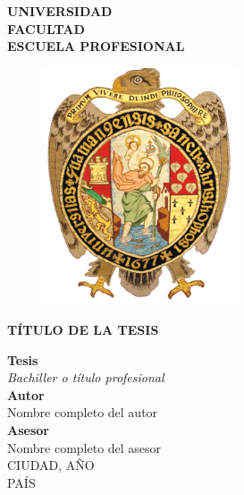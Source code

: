 \documentclass[12pt,a4paper]{article} %
\begin{document}
\pagestyle{empty} %

\begin{titlepage}
	\begin{center}
		{\textbf{UNIVERSIDAD}}\\
		{\textbf{FACULTAD}}\\
		{\textbf{ESCUELA PROFESIONAL}}\\
		\vspace{2cm}
			\begin{figure}[h]
				\centering
				\includegraphics[height=7cm]{EXAMEN_FINAL/Imagenes/logo-unsch.png}
			\end{figure}
		\vspace{2mm}
				\begin{center}
					{\textbf{TÍTULO DE LA TESIS}}
				\end{center}
	  \vspace{1cm}
			{\bf Tesis}\\
		\vspace{2mm}
			{\textit{Bachiller o título profesional}}\\
    \vspace{1cm}
			{\bf Autor}\\
		\vspace{2mm}
			{Nombre completo del autor}\\
		\vspace{4mm}
    	{\bf Asesor}\\
		\vspace{2mm}
			{Nombre completo del asesor}\\
	  \vspace{16mm}
			{CIUDAD, AÑO}\\
	  \vspace{2mm}
			{PAÍS}
	\end{center}
\end{titlepage}
\end{document}

